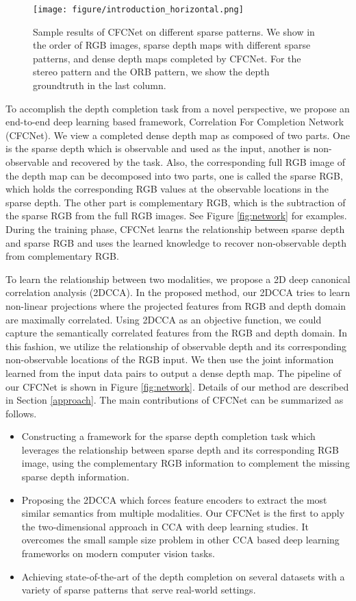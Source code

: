 \documentclass{article}
\begin{document}
\begin{figure}[bt!]
    \centering
    \texttt{[image: figure/introduction\_horizontal.png]}
    \caption{Sample results of CFCNet on different sparse patterns. We show in the order of RGB images, sparse depth maps with different sparse patterns, and dense depth maps completed by CFCNet. For the stereo pattern and the ORB pattern, we show the depth groundtruth in the last column.}
    \label{fig:introduction}
\end{figure}

To accomplish the depth completion task from a novel perspective, we propose an end-to-end deep learning based framework, Correlation For Completion Network (CFCNet). We view a completed dense depth map as composed of two parts. One is the sparse depth which is observable and used as the input, another is non-observable and recovered by the task. Also, the corresponding full RGB image of the depth map can be decomposed into two parts, one is called the sparse RGB, which holds the corresponding RGB values at the observable locations in the sparse depth. The other part is complementary RGB, which is the subtraction of the sparse RGB from the full RGB images. See Figure \ref{fig:network} for examples. During the training phase, CFCNet learns the relationship between sparse depth and sparse RGB and uses the learned knowledge to recover non-observable depth from complementary RGB.

To learn the relationship between two modalities, we propose a 2D deep canonical correlation analysis (2DCCA). In the proposed method, our 2DCCA tries to learn non-linear projections where the projected features from RGB and depth domain are maximally correlated. Using 2DCCA as an objective function, we could capture the semantically correlated features from the RGB and depth domain. In this fashion, we utilize the relationship of observable depth and its corresponding non-observable locations of the RGB input. We then use the joint information learned from the input data pairs to output a dense depth map. The pipeline of our CFCNet is shown in Figure \ref{fig:network}. Details of our method are described in Section \ref{approach}. The main contributions of CFCNet can be summarized as follows.
\begin{itemize}
\setlength\itemsep{0cm}
    \item Constructing a framework for the sparse depth completion task which leverages the relationship between sparse depth and its corresponding RGB image, using the complementary RGB information to complement the missing sparse depth information. 
    \item Proposing the 2DCCA which forces feature encoders to extract the most similar semantics from multiple modalities. Our CFCNet is the first to apply the two-dimensional approach in CCA with deep learning studies. It overcomes the small sample size problem in other CCA based deep learning frameworks on modern computer vision tasks.
    \item Achieving state-of-the-art of the depth completion on several datasets with a variety of sparse patterns that serve real-world settings.
\end{itemize}
\end{document}

